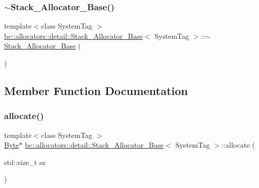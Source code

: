 \subsubsection{\texorpdfstring{$\sim$\+Stack\+\_\+\+Allocator\+\_\+\+Base()}{~Stack\_Allocator\_Base()}}
{\footnotesize\ttfamily template$<$class System\+Tag $>$ \\
\hyperlink{classbc_1_1allocators_1_1detail_1_1Stack__Allocator__Base}{bc\+::allocators\+::detail\+::\+Stack\+\_\+\+Allocator\+\_\+\+Base}$<$ System\+Tag $>$\+::$\sim$\hyperlink{classbc_1_1allocators_1_1detail_1_1Stack__Allocator__Base}{Stack\+\_\+\+Allocator\+\_\+\+Base} (\begin{DoxyParamCaption}{ }\end{DoxyParamCaption})\hspace{0.3cm}{\ttfamily [inline]}}



\subsection{Member Function Documentation}
\mbox{\label{classbc_1_1allocators_1_1detail_1_1Stack__Allocator__Base_a1d814bdc15336ebee7eca671a14fcbca}} 
\subsubsection{\texorpdfstring{allocate()}{allocate()}\hspace{0.1cm}{\footnotesize\ttfamily [1/2]}}
{\footnotesize\ttfamily template$<$class System\+Tag $>$ \\
\hyperlink{classbc_1_1allocators_1_1Byte}{Byte}$\ast$ \hyperlink{classbc_1_1allocators_1_1detail_1_1Stack__Allocator__Base}{bc\+::allocators\+::detail\+::\+Stack\+\_\+\+Allocator\+\_\+\+Base}$<$ System\+Tag $>$\+::allocate (\begin{DoxyParamCaption}\item[{std\+::size\+\_\+t}]{sz }\end{DoxyParamCaption})\hspace{0.3cm}{\ttfamily [inline]}}

